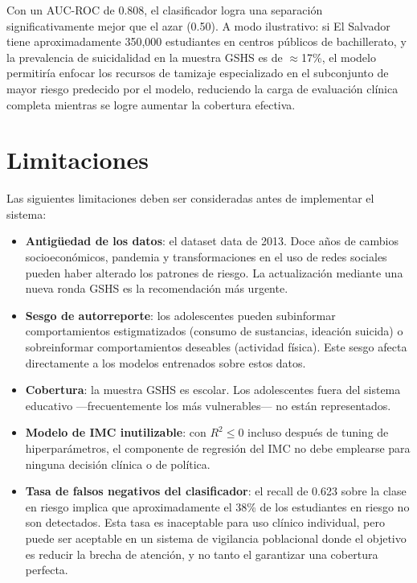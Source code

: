 \documentclass[conference]{IEEEtran}
\begin{document}
Con un AUC-ROC de 0.808, el clasificador logra una separación significativamente mejor que el azar (0.50). A modo ilustrativo: si El Salvador tiene aproximadamente 350,000 estudiantes en centros públicos de bachillerato, y la prevalencia de suicidalidad en la muestra GSHS es de $\approx$17\%, el modelo permitiría enfocar los recursos de tamizaje especializado en el subconjunto de mayor riesgo predecido por el modelo, reduciendo la carga de evaluación clínica completa mientras se logre aumentar la cobertura efectiva.

\section{Limitaciones}

Las siguientes limitaciones deben ser consideradas antes de implementar el sistema:

\begin{itemize}
  \item \textbf{Antigüedad de los datos}: el dataset data de 2013. Doce años de cambios socioeconómicos, pandemia y transformaciones en el uso de redes sociales pueden haber alterado los patrones de riesgo. La actualización mediante una nueva ronda GSHS es la recomendación más urgente.
  \item \textbf{Sesgo de autorreporte}: los adolescentes pueden subinformar comportamientos estigmatizados (consumo de sustancias, ideación suicida) o sobreinformar comportamientos deseables (actividad física). Este sesgo afecta directamente a los modelos entrenados sobre estos datos.
  \item \textbf{Cobertura}: la muestra GSHS es escolar. Los adolescentes fuera del sistema educativo ---frecuentemente los más vulnerables--- no están representados.
  \item \textbf{Modelo de IMC inutilizable}: con $R^2 \leq 0$ incluso después de tuning de hiperparámetros, el componente de regresión del IMC no debe emplearse para ninguna decisión clínica o de política.
  \item \textbf{Tasa de falsos negativos del clasificador}: el recall de 0.623 sobre la clase en riesgo implica que aproximadamente el 38\% de los estudiantes en riesgo no son detectados. Esta tasa es inaceptable para uso clínico individual, pero puede ser aceptable en un sistema de vigilancia poblacional donde el objetivo es reducir la brecha de atención, y no tanto el garantizar una cobertura perfecta.
\end{itemize}
\end{document}

